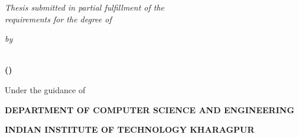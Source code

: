 \thispagestyle{empty}
\providecommand{\mydep}{Department of Computer Science and Engineering}
\providecommand{\myinst}{Indian Institute of Technology Kharagpur}

\begin{center}
    {\large {\bfseries {\mytitle}} \par}
\vspace{3\baselineskip}
    {\textit{Thesis submitted in partial fulfillment of the}\\
    \textit{requirements for the degree of}}\par
\vspace{\baselineskip}
    {\large \bf \mydegree \par} 
\vspace{\baselineskip}
    {\textit{by} \par}
\vspace{\baselineskip}
    {{\large {\bf \myname \\ (\myrollno)}} \par}
\vspace{1.5\baselineskip}
    {Under the guidance of \par}
\vspace{\baselineskip}
    {{\large \bf \mysupervisor} \par}
\vspace{1.5\baselineskip}
    {\begin{figure}[!h] 
	\centering
     \end{figure}
    }
\vspace{1.5\baselineskip}
    {\bf \uppercase{\mydep} \par}
\vspace*{1ex}
    {\bf \uppercase{\myinst} \par}
\vspace*{1ex}
    {\bf \mydegreedate \par}
\end{center}
